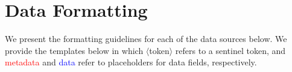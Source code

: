 \documentclass[10pt]{article} %
\begin{document}



     

\section{Data Formatting}
We present the formatting guidelines for each of the data sources below. We provide the templates below in which $\langle$token$\rangle$ refers to a sentinel token, and \textcolor{red}{metadata} and \textcolor{blue}{data} refer to placeholders for data fields, respectively. 
\end{document}
